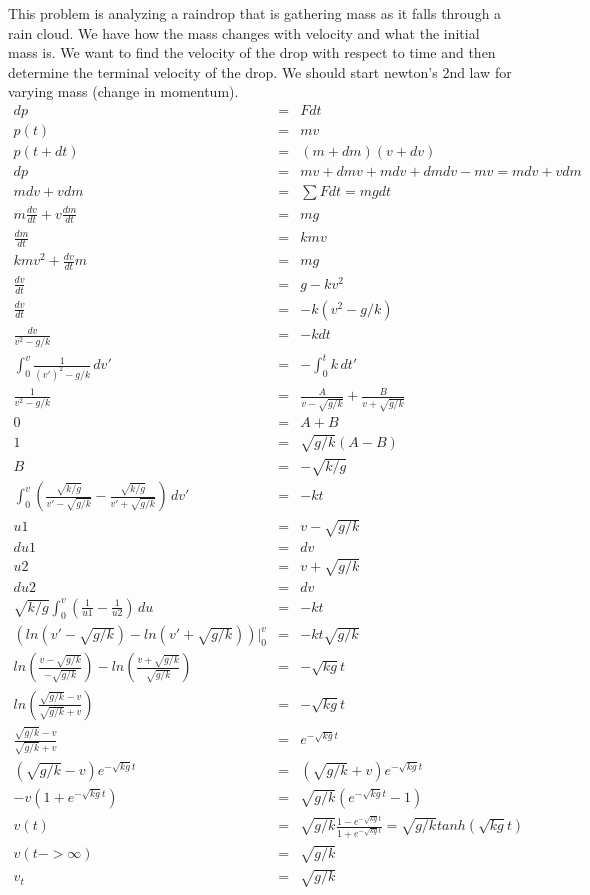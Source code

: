 \documentclass[11pt]{article}
\begin{document}
This problem is analyzing a raindrop that is gathering mass as it falls through a rain cloud. We have how the mass changes with velocity and what the initial mass is. We want to find the velocity of the drop with respect to time and then determine the terminal velocity of the drop. We should start newton's 2nd law for varying mass (change in momentum). \\
\begin{eqnarray*}
dp &=& Fdt \\
p(t) &=& mv \\
p(t+dt) &=& (m+dm)(v+dv) \\
dp &=& mv+dmv+mdv+dmdv-mv = mdv+vdm \\
 mdv+vdm &=& \sum{F}dt = mgdt \\
m\frac{dv}{dt}+v\frac{dm}{dt} &=& mg \\
\frac{dm}{dt} &=& kmv \\
kmv^{2}+\frac{dv}{dt}m &=& mg \\
\frac{dv}{dt} &=& g-kv^{2} \\
\frac{dv}{dt} &=& -k(v^{2}-g/k) \\
\frac{dv}{v^{2}-g/k} &=& -kdt \\
\int_{0}^{v}\frac{1}{(v')^{2}-g/k}\,dv' &=& -\int_{0}^{t}k\,dt' \\
\frac{1}{v^{2}-g/k} &=& \frac{A}{v-\sqrt{g/k}} +\frac{B}{v+\sqrt{g/k}} \\
0 &=& A+B \\
1 &=& \sqrt{g/k}(A-B) \\
B &=& -\sqrt{k/g} \\
\int_{0}^{v}(\frac{\sqrt{k/g}}{v'-\sqrt{g/k}}-\frac{\sqrt{k/g}}{v'+\sqrt{g/k}})\,dv' &=& -kt \\
u1 &=& v-\sqrt{g/k} \\
du1 &=& dv \\
u2 &=& v+\sqrt{g/k} \\
du2 &=& dv \\
\sqrt{k/g}\int_{0}^{v}(\frac{1}{u1}-\frac{1}{u2})\,du &=& -kt \\
(ln(v'-\sqrt{g/k})-ln(v'+\sqrt{g/k}))|_{0}^{v} &=& -kt\sqrt{g/k} \\
ln(\frac{v-\sqrt{g/k}}{-\sqrt{g/k}})-ln(\frac{v+\sqrt{g/k}}{\sqrt{g/k}}) &=& -\sqrt{kg}t \\
ln(\frac{\sqrt{g/k}-v}{\sqrt{g/k}+v}) &=& -\sqrt{kg}t \\
\frac{\sqrt{g/k}-v}{\sqrt{g/k}+v} &=& e^{-\sqrt{kg}t} \\
(\sqrt{g/k}-v)e^{-\sqrt{kg}t} &=& (\sqrt{g/k}+v)e^{-\sqrt{kg}t} \\
-v(1+e^{-\sqrt{kg}t}) &=& \sqrt{g/k}(e^{-\sqrt{kg}t}-1) \\
v(t)  &=& \sqrt{g/k}\frac{1-e^{-\sqrt{kg}t}}{1+e^{-\sqrt{kg}t}} = \sqrt{g/k}tanh(\sqrt{kg}t) \\
v(t->\infty) &=& \sqrt{g/k} \\
v_{t} &=& \sqrt{g/k} 
\end{eqnarray*} \\
\end{document}
